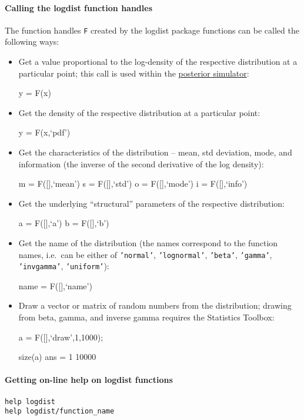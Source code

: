 \paragraph{Calling the logdist function
handles}

The function handles \texttt{F} created by the logdist package functions
can be called the following ways:

\begin{itemize}
\item
  Get a value proportional to the log-density of the respective
  distribution at a particular point; this call is used within the
  \href{poster/Contents}{posterior simulator}:

  y = F(x)
\item
  Get the density of the respective distribution at a particular point:

  y = F(x,`pdf')
\item
  Get the characteristics of the distribution -- mean, std deviation,
  mode, and information (the inverse of the second derivative of the log
  density):

  m = F({[}{]},`mean') s = F({[}{]},`std') o = F({[}{]},`mode') i =
  F({[}{]},`info')
\item
  Get the underlying ``structural'' parameters of the respective
  distribution:

  a = F({[}{]},`a') b = F({[}{]},`b')
\item
  Get the name of the distribution (the names correspond to the function
  names, i.e.~can be either of \texttt{'normal'}, \texttt{'lognormal'},
  \texttt{'beta'}, \texttt{'gamma'}, \texttt{'invgamma'},
  \texttt{'uniform'}):

  name = F({[}{]},`name')
\item
  Draw a vector or matrix of random numbers from the distribution;
  drawing from beta, gamma, and inverse gamma requires the Statistics
  Toolbox:

  a = F({[}{]},`draw',1,1000);

  size(a) ans = 1 10000
\end{itemize}

\paragraph{Getting on-line help on logdist
functions}

\begin{verbatim}
help logdist
help logdist/function_name
\end{verbatim}



